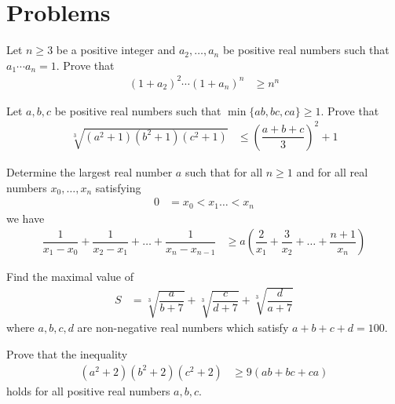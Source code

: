 \documentclass{subfile}
\begin{document}
	\chapter{Problems}\label{ch:problems}
	
		\begin{problem}
			Let $n\geq3$ be a positive integer and $a_2,\ldots,a_n$ be positive real numbers such that $a_1\cdots a_n=1$. Prove that
				\begin{align*}
					(1+a_2)^{2}\cdots(1+a_n)^{n}
						& \geq n^{n}
				\end{align*}
		\end{problem}
	
		\begin{problem}
			Let $a,b,c$ be positive real numbers such that $\min\{ab,bc,ca\}\geq1$. Prove that
				\begin{align*}
					\sqrt[3]{(a^2+1)(b^2+1)(c^2+1)}
						& \leq\left(\dfrac{a+b+c}{3}\right)^2+1
				\end{align*}
		\end{problem}
	
		\begin{problem}
			Determine the largest real number $a$ such that for all $n\geq1$ and for all real numbers $x_{0},\ldots,x_{n}$ satisfying
				\begin{align*}
					0
						& = x_{0}<x_{1}\ldots<x_{n}
				\end{align*}
			we have
				\begin{align*}
					\dfrac{1}{x_{1}-x_{0}}+\dfrac{1}{x_{2}-x_{1}}+\ldots+\dfrac{1}{x_{n}-x_{n-1}}
						& \geq a\left(\dfrac{2}{x_{1}}+\dfrac{3}{x_{2}}+\ldots+\dfrac{n+1}{x_{n}}\right)
				\end{align*}
		\end{problem}
	
		\begin{problem}
			Find the maximal value of
				\begin{align*}
					S
						& = \sqrt[3]{\dfrac{a}{b+7}}+\sqrt[3]{\dfrac{c}{d+7}}+\sqrt[3]{\dfrac{d}{a+7}}
				\end{align*}
			where $a,b,c,d$ are non-negative real numbers which satisfy $a+b+c+d=100$.
		\end{problem}
	
		\begin{problem}
			Prove that the inequality
				\begin{align*}
					(a^{2}+2)(b^{2}+2)(c^{2}+2)
						& \geq9(ab+bc+ca)
				\end{align*}
			holds for all positive real numbers $a,b,c$.
		\end{problem}
	
\end{document}
